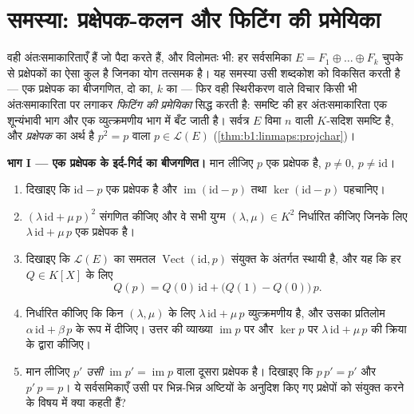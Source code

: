 \section{समस्या: प्रक्षेपक-कलन और फिटिंग की प्रमेयिका}

\begin{problem}\label{pb:b1:linmaps:1}
 वही अंतःसमाकारिताएँ हैं जो  पैदा करते हैं, और विलोमतः
भी: हर सर्वसमिका $E = F_1 \oplus \dots \oplus F_k$ चुपके से प्रक्षेपकों का
ऐसा कुल है जिनका योग तत्समक है। यह समस्या उसी शब्दकोश को विकसित करती है ---
एक प्रक्षेपक का बीजगणित, दो का, $k$ का --- फिर वही स्थिरीकरण वाले विचार किसी
भी अंतःसमाकारिता पर लगाकर \emph{फिटिंग की प्रमेयिका} सिद्ध करती है:
 समष्टि की हर अंतःसमाकारिता एक शून्यंभावी भाग और एक
व्युत्क्रमणीय भाग में बँट जाती है। सर्वत्र $E$ विमा $n$ वाली $K$-सदिश समष्टि
है, और \emph{प्रक्षेपक} का अर्थ है $p^2 = p$ वाला $p \in \mathcal{L}(E)$
(\cref{thm:b1:linmaps:projchar})। 

\medskip \noindent\textbf{भाग I --- एक प्रक्षेपक के इर्द-गिर्द का बीजगणित।}
मान लीजिए $p$ एक प्रक्षेपक है, $p \neq 0$, $p \neq \mathrm{id}$।
\begin{enumerate}
  \item दिखाइए कि $\mathrm{id} - p$ एक प्रक्षेपक है और
  $\operatorname{im}(\mathrm{id} - p)$ तथा $\ker(\mathrm{id} - p)$ पहचानिए।
  \item $(\lambda\,\mathrm{id} + \mu\,p)^2$ संगणित कीजिए और वे सभी युग्म
  $(\lambda, \mu) \in K^2$ निर्धारित कीजिए जिनके लिए $\lambda\,\mathrm{id} +
  \mu\,p$ एक प्रक्षेपक है।
  \item दिखाइए कि $\mathcal{L}(E)$ का समतल $\operatorname{Vect}(\mathrm{id},
  p)$ संयुक्त  के अंतर्गत स्थायी है, और यह कि हर  $Q \in
  K[X]$ के लिए
        \[
        Q(p) = Q(0)\,\mathrm{id} + \bigl(Q(1) -
        Q(0)\bigr)\,p .
        \]
  \item निर्धारित कीजिए कि किन $(\lambda, \mu)$ के लिए 
  $\lambda\,\mathrm{id} + \mu\,p$ व्युत्क्रमणीय है, और उसका प्रतिलोम
  $\alpha\,\mathrm{id} + \beta\,p$ के रूप में दीजिए। उत्तर की व्याख्या
  $\operatorname{im} p$ पर और $\ker p$ पर $\lambda\,\mathrm{id} + \mu\,p$ की
  क्रिया के द्वारा कीजिए।
  \item मान लीजिए $p'$ \emph{उसी } $\operatorname{im} p' =
  \operatorname{im} p$ वाला दूसरा प्रक्षेपक है। दिखाइए कि $p\,p' = p'$ और
  $p'\,p = p$। ये सर्वसमिकाएँ उसी  पर भिन्न-भिन्न अष्टियों के अनुदिश
  किए गए प्रक्षेपों को संयुक्त करने के विषय में क्या कहती हैं?
\end{enumerate}


\end{problem}
